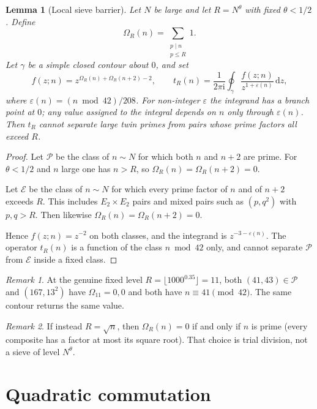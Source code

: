 \documentclass[11pt,a4paper]{article}
\theoremstyle{plain}
\newtheorem{lemma}{Lemma}
\theoremstyle{remark}
\newtheorem{remark}{Remark}
\newcommand{\PP}{\mathcal{P}}
\newcommand{\EE}{\mathcal{E}}
\begin{document}
\begin{lemma}[Local sieve barrier]
\label{lem:local}
Let \(N\) be large and let \(R=N^\theta\) with fixed \(\theta<1/2\). Define
\[
\Omega_R(n)=\sum_{\substack{p\mid n\\ p\le R}}1.
\]
Let \(\gamma\) be a simple closed contour about \(0\), and set
\[
f(z;n)=z^{\Omega_R(n)+\Omega_R(n+2)-2},\qquad
t_R(n)=\frac{1}{2\pi\mathrm{i}}\oint_\gamma\frac{f(z;n)}{z^{1+\varepsilon(n)}}\,\mathrm{d}z,
\]
where \(\varepsilon(n)=(n\bmod 42)/208\). For non-integer \(\varepsilon\) the integrand has a branch point at \(0\); any value assigned to the integral depends on \(n\) only through \(\varepsilon(n)\). Then \(t_R\) cannot separate large twin primes from pairs whose prime factors all exceed \(R\).
\end{lemma}

\begin{proof}
Let \(\PP\) be the class of \(n\sim N\) for which both \(n\) and \(n+2\) are prime. For \(\theta<1/2\) and \(n\) large one has \(n>R\), so \(\Omega_R(n)=\Omega_R(n+2)=0\).

Let \(\EE\) be the class of \(n\sim N\) for which every prime factor of \(n\) and of \(n+2\) exceeds \(R\). This includes \(E_2\times E_2\) pairs and mixed pairs such as \((p,q^2)\) with \(p,q>R\). Then likewise \(\Omega_R(n)=\Omega_R(n+2)=0\).

Hence \(f(z;n)=z^{-2}\) on both classes, and the integrand is \(z^{-3-\varepsilon(n)}\). The operator \(t_R(n)\) is a function of the class \(n\bmod 42\) only, and cannot separate \(\PP\) from \(\EE\) inside a fixed class.
\end{proof}

\begin{remark}
At the genuine fixed level \(R=\lfloor 1000^{0.35}\rfloor=11\), both \((41,43)\in\PP\) and \((167,13^2)\) have \(\Omega_{11}=0,0\) and both have \(n\equiv 41\pmod{42}\). The same contour returns the same value.
\end{remark}

\begin{remark}
If instead \(R=\sqrt{n}\), then \(\Omega_R(n)=0\) if and only if \(n\) is prime (every composite has a factor at most its square root). That choice is trial division, not a sieve of level \(N^\theta\).
\end{remark}

\section{Quadratic commutation}
\end{document}
